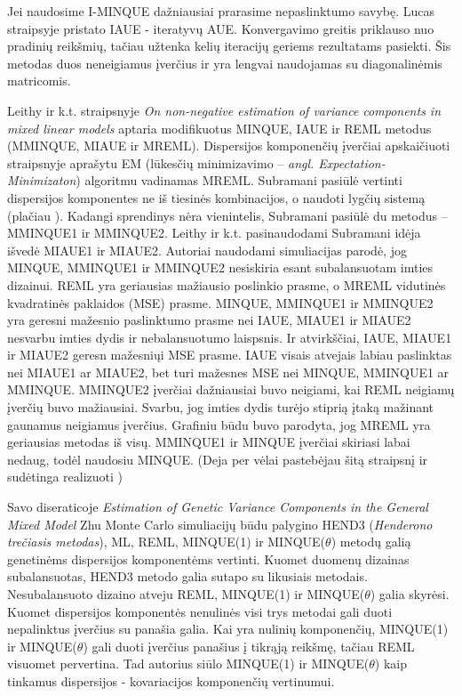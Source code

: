 \documentclass[12pt,a4paper]{article}
\begin{document}
\indent Jei naudosime I-MINQUE dažniausiai prarasime nepaslinktumo savybę. Lucas straipsyje \cite{IAUE} pristato IAUE - iteratyvų AUE. Konvergavimo greitis priklauso nuo pradinių reikšmių, tačiau užtenka kelių iteracijų geriems rezultatams pasiekti. Šis metodas duos neneigiamus įverčius ir yra lengvai naudojamas su diagonalinėmis matricomis.

\indent Leithy ir k.t. straipsnyje \textit{On non-negative estimation of variance components in mixed linear models} \cite{MMINQUE} aptaria  modifikuotus MINQUE, IAUE ir REML metodus (MMINQUE, MIAUE ir MREML). Dispersijos komponenčių įverčiai apskaičiuoti straipsnyje aprašytu EM (lūkesčių minimizavimo --  \textit{angl. Expectation-Minimizaton}) algoritmu vadinamas MREML. Subramani \cite{MMIVQUE} pasiūlė vertinti dispersijos komponentes ne iš tiesinės kombinacijos, o naudoti lygčių sistemą (plačiau \cite{MMINQUE}). Kadangi sprendinys nėra vienintelis, Subramani pasiūlė du metodus -- MMINQUE1 ir MMINQUE2. Leithy ir k.t. pasinaudodami Subramani idėja išvedė MIAUE1 ir MIAUE2. Autoriai naudodami simuliacijas parodė, jog MINQUE, MMINQUE1 ir MMINQUE2 nesiskiria esant subalansuotam imties dizainui. REML yra geriausias mažiausio poslinkio prasme, o MREML vidutinės kvadratinės paklaidos (MSE) prasme. MINQUE, MMINQUE1 ir MMINQUE2 yra geresni mažesnio paslinktumo prasme nei IAUE, MIAUE1 ir MIAUE2 nesvarbu imties dydis ir nebalansuotumo laispsnis. Ir atvirkščiai, IAUE, MIAUE1 ir MIAUE2 geresn mažesniųi MSE prasme. IAUE visais atvejais labiau paslinktas nei MIAUE1 ar MIAUE2, bet turi mažesnes MSE nei MINQUE, MMINQUE1 ar MMINQUE. MMINQUE2 įverčiai dažniausiai buvo neigiami, kai REML neigiamų įverčių buvo mažiausiai. Svarbu, jog imties dydis turėjo stiprią įtaką mažinant gaunamus neigiamus įverčius. Grafiniu būdu buvo parodyta, jog MREML yra geriausias metodas iš visų. MMINQUE1 ir MINQUE įverčiai skiriasi labai nedaug, todėl naudosiu MINQUE. (Deja per vėlai pastebėjau šitą straipsnį ir sudėtinga realizuoti )

Savo diseraticoje \textit{Estimation of Genetic Variance Components in the General Mixed Model}\cite{zhu} Zhu Monte Carlo simuliacijų būdu palygino HEND3 (\textit{Henderono trečiasis metodas}), ML, REML, MINQUE(1) ir MINQUE($\theta$) metodų galią genetinėms dispersijos komponentėms vertinti. Kuomet duomenų dizainas subalansuotas, HEND3 metodo galia sutapo su likusiais metodais. Nesubalansuoto dizaino atveju REML, MINQUE(1) ir MINQUE($\theta$) galia skyrėsi. Kuomet dispersijos komponentės nenulinės visi trys metodai gali duoti nepalinktus įverčius su panašia galia. Kai yra nulinių komponenčių, MINQUE(1) ir MINQUE($\theta$) gali duoti įverčius panašius į tikrąją reikšmę, tačiau REML visuomet pervertina. Tad autorius siūlo MINQUE(1) ir MINQUE($\theta$) kaip tinkamus dispersijos - kovariacijos komponenčių vertinumui.
\end{document}

